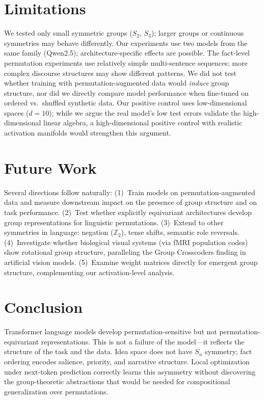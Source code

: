\documentclass[10pt, letterpaper]{article}
\begin{document}
\section{Limitations}
\label{sec:limitations}

We tested only small symmetric groups ($S_2$, $S_3$); larger groups or continuous symmetries may behave differently. Our experiments use two models from the same family (Qwen2.5); architecture-specific effects are possible. The fact-level permutation experiments use relatively simple multi-sentence sequences; more complex discourse structures may show different patterns. We did not test whether training with permutation-augmented data would \emph{induce} group structure, nor did we directly compare model performance when fine-tuned on ordered vs.\ shuffled synthetic data. Our positive control uses low-dimensional spaces ($d = 10$); while we argue the real model's low test errors validate the high-dimensional linear algebra, a high-dimensional positive control with realistic activation manifolds would strengthen this argument.

\section{Future Work}
\label{sec:future}

Several directions follow naturally: (1)~Train models on permutation-augmented data and measure downstream impact on the presence of group structure and on task performance. (2)~Test whether explicitly equivariant architectures develop group representations for linguistic permutations. (3)~Extend to other symmetries in language: negation ($\mathbb{Z}_2$), tense shifts, semantic role reversals. (4)~Investigate whether biological visual systems (via fMRI population codes) show rotational group structure, paralleling the Group Crosscoders finding in artificial vision models. (5)~Examine weight matrices directly for emergent group structure, complementing our activation-level analysis.

\section{Conclusion}
\label{sec:conclusion}

Transformer language models develop permutation-sensitive but not permutation-equivariant representations. This is not a failure of the model---it reflects the structure of the task and the data. Idea space does not have $S_n$ symmetry; fact ordering encodes salience, priority, and narrative structure. Local optimization under next-token prediction correctly learns this asymmetry without discovering the group-theoretic abstractions that would be needed for compositional generalization over permutations.
\end{document}

